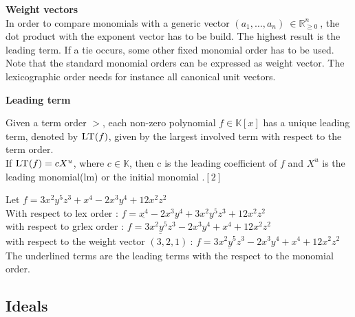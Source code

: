 \textbf{Weight vectors} \\
In order to compare monomials with a generic vector $\left({a}_{1},\dots ,{a}_{n}\right)~\in \mathbb{R}^{n}_{\geq 0}~$, the dot product with the exponent vector has to be build. The highest result is the leading term. If a tie occurs, some other fixed monomial order has to be used. Note that the standard monomial orders can be expressed as weight vector. The lexicographic order needs for instance all canonical unit vectors.

\textbf{Leading term}

Given a term order $>$, each non-zero polynomial $f \in \mathbb{K}\left[ x\right] $ has a unique leading term, denoted by $\textsc{LT}(f)$, given by the largest involved term with respect to the term order.\\
If $\textsc{LT}(f) = cX^{u}$, where $c \in \mathbb{K}$, then c is the leading coefficient of $f$ and $X^{u}$ is the leading monomial(lm) or the initial monomial .$\left[ 2\right]$\\

\begin{env_example}
\normalfont Let $ f = 3x^{2}y^{5}z^{3} + x^{4} -2x^{3}y^{4} + 12x^{2}z^{2}$ \\
With respect to lex order : $f = \underline{x^{4}} -2x^{3}y^{4} + 3x^{2}y^{5}z^{3} + 12x^{2}z^{2} $ \\
with respect to grlex order : $f = \underline{3x^{2}y^{5}z^{3}} -2x^{3}y^{4} + x^{4}+ 12x^{2}z^{2}$  \\
with respect to the weight vector $\left(3,2,1\right)~$: $f = \underline{3x^{2}y^{5}z^{3}} -2x^{3}y^{4} + x^{4}+ 12x^{2}z^{2}$  \\ 
The underlined terms are the leading terms with the respect to the monomial order.

\end{env_example}


\subsection{Ideals}
\label{subsec:Ideals}

